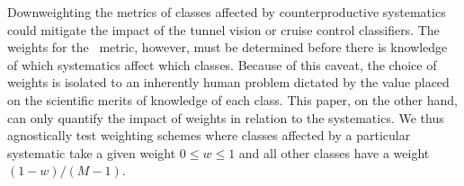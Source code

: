 Downweighting the metrics of classes affected by counterproductive systematics could mitigate the impact of the tunnel vision or cruise control classifiers.
The weights for the \plasticc\ metric, however, must be determined before there is knowledge of which systematics affect which classes.
Because of this caveat, the choice of weights is isolated to an inherently human problem dictated by the value placed on the scientific merits of knowledge of each class.
This paper, on the other hand, can only quantify the impact of weights in relation to the systematics.
We thus agnostically test weighting schemes where classes affected by a particular systematic take a given weight $0 \leq w \leq 1$ and all other classes have a weight $(1 - w) / (M - 1)$.
